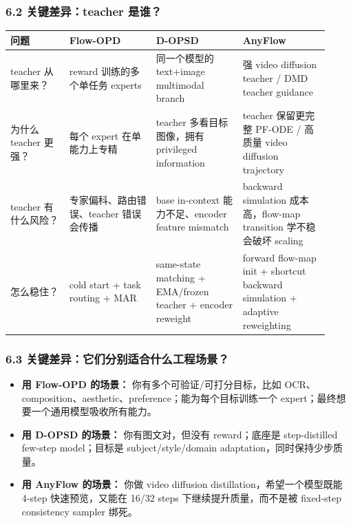 \subsubsection{6.2 关键差异：teacher 是谁？}

\begin{center}
\scriptsize
\setlength{\tabcolsep}{3pt}
\begin{tabular}{p{0.17\linewidth}p{0.25\linewidth}p{0.25\linewidth}p{0.25\linewidth}}
\toprule
\textbf{问题} & \textbf{Flow-OPD} & \textbf{D-OPSD} & \textbf{AnyFlow}\\
\midrule
teacher 从哪里来？ & reward 训练的多个单任务 experts & 同一个模型的 text+image multimodal branch & 强 video diffusion teacher / DMD teacher guidance\\
为什么 teacher 更强？ & 每个 expert 在单能力上专精 & teacher 多看目标图像，拥有 privileged information & teacher 保留更完整 PF-ODE / 高质量 video diffusion trajectory\\
teacher 有什么风险？ & 专家偏科、路由错误、teacher 错误会传播 & base in-context 能力不足、encoder feature mismatch & backward simulation 成本高，flow-map transition 学不稳会破坏 scaling\\
怎么稳住？ & cold start + task routing + MAR & same-state matching + EMA/frozen teacher + encoder reweight & forward flow-map init + shortcut backward simulation + adaptive reweighting\\
\bottomrule
\end{tabular}
\end{center}

\subsubsection{6.3 关键差异：它们分别适合什么工程场景？}

\begin{itemize}[leftmargin=1.5em]
  \item \textbf{用 Flow-OPD 的场景：} 你有多个可验证/可打分目标，比如 OCR、composition、aesthetic、preference；能为每个目标训练一个 expert；最终想要一个通用模型吸收所有能力。
  \item \textbf{用 D-OPSD 的场景：} 你有图文对，但没有 reward；底座是 step-distilled few-step model；目标是 subject/style/domain adaptation，同时保持少步质量。
  \item \textbf{用 AnyFlow 的场景：} 你做 video diffusion distillation，希望一个模型既能 4-step 快速预览，又能在 16/32 steps 下继续提升质量，而不是被 fixed-step consistency sampler 绑死。
\end{itemize}

